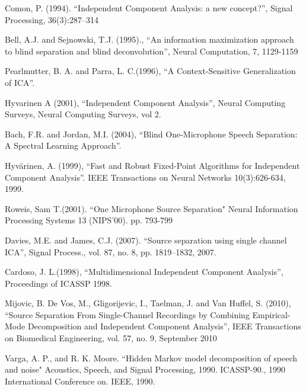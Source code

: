 
\begin{thebibliography}{99}

 Comon, P. (1994). 
``Independent Component Analysis: a new concept?'', 
Signal Processing, 36(3):287–314

 Bell, A.J. and Sejnowski, T.J. (1995).,
``An information maximization approach to blind separation and blind deconvolution'', 
Neural Computation, 7, 1129-1159

Pearlmutter, B. A. and Parra, L. C.(1996),
``A Context-Sensitive Generalization of ICA''. 

Hyvarinen A (2001),
``Independent Component Analysis'',
Neural Computing Surveys, Neural Computing Surveys, vol 2.

 Bach, F.R. and Jordan, M.I. (2004),
``Blind One-Microphone Speech Separation: A Spectral Learning
  Approach''.

Hyvärinen, A. (1999),
``Fast and Robust Fixed-Point Algorithms for Independent Component
  Analysis''. 
IEEE Transactions on Neural Networks 10(3):626-634, 1999.

Roweis, Sam T.(2001).
``One Microphone Source Separation"
Neural Information Processing Systems 13 (NIPS'00).
pp. 793-799
  
Davies, M.E. and James, C.J. (2007).
``Source separation using single channel ICA'',
Signal Process., vol. 87, no. 8, pp. 1819–1832, 2007.

Cardoso, J. L.(1998),
``Multidimensional Independent Component Analysis'',
Proceedings of ICASSP 1998.

 Mijovic, B. De Vos, M.,  Gligorijevic, I.,
  Taelman, J. and Van Huffel, S. (2010),
``Source Separation From Single-Channel Recordings by Combining
  Empirical-Mode Decomposition and Independent Component Analysis'',
IEEE Transactions on Biomedical Engineering, vol. 57, no. 9, September 2010

Varga, A. P., and R. K. Moore. 
``Hidden Markov model decomposition of speech and noise"
Acoustics, Speech, and Signal Processing, 1990. ICASSP-90., 1990 International Conference on. IEEE, 1990.




\end{thebibliography}
